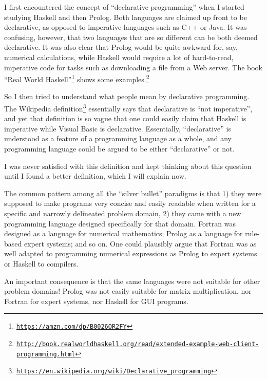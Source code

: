 I first encountered the concept of \textsf{``}declarative programming\textsf{''} when
I started studying Haskell and then Prolog. Both languages are claimed
up front to be declarative, as opposed to imperative languages such
as C++ or Java. It was confusing, however, that two languages that
are so different can be both deemed declarative. It was also clear
that Prolog would be quite awkward for, say, numerical calculations,
while Haskell would require a lot of hard-to-read, imperative code
for tasks such as downloading a file from a Web server. The book \textsf{``}Real
World Haskell\textsf{''}\footnote{\texttt{\href{https://amzn.com/dp/B0026OR2FY}{https://amzn.com/dp/B0026OR2FY}}}
shows some examples.\texttt{}\footnote{\texttt{\href{http://book.realworldhaskell.org/read/extended-example-web-client-programming.html}{http://book.realworldhaskell.org/read/extended-example-web-client-programming.html}}}

So I then tried to understand what people mean by declarative programming.
The Wikipedia definition\footnote{\texttt{\href{https://en.wikipedia.org/wiki/Declarative_programming}{https://en.wikipedia.org/wiki/Declarative\_programming}}}
essentially says that declarative is \textsf{``}not imperative\textsf{''}, and yet
that definition is so vague that one could easily claim that Haskell
is imperative while Visual Basic is declarative. Essentially, \textsf{``}declarative\textsf{''}
is understood as a feature of a programming language as a whole, and
any programming language could be argued to be either \textsf{``}declarative\textsf{''}
or not.

I was never satisfied with this definition and kept thinking about
this question until I found a better definition, which I will explain
now.

The common pattern among all the \textsf{``}silver bullet\textsf{''} paradigms is
that 1) they were supposed to make programs very concise and easily
readable when written for a specific and narrowly delineated problem
domain, 2) they came with a new programming language designed specifically
for that domain. Fortran was designed as a language for numerical
mathematics; Prolog as a language for rule-based expert systems; and
so on. One could plausibly argue that Fortran was as well adapted
to programming numerical expressions as Prolog to expert systems or
Haskell to compilers.

An important consequence is that the same languages were not suitable
for other problem domains! Prolog was not easily suitable for matrix
multiplication, nor Fortran for expert systems, nor Haskell for GUI
programs.

